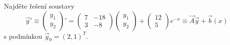 \begin{ex}
   Najděte řešení soustavy
   \[
      \vec{y}'\equiv
      \begin{pmatrix}
         y_1\\y_2
      \end{pmatrix}'
      =
      \begin{pmatrix}
         7 & -18 \\ 3 & -8
      \end{pmatrix}
      \begin{pmatrix}
         y_1\\y_2
      \end{pmatrix}
      +
      \begin{pmatrix}
         12 \\ 5
      \end{pmatrix}
      e^{-x}
      \equiv \vec{A}\vec{y}+\vec{b}(x)
   \]
   s podmínkou $\vec{y}_0=(2,1)^T$.
\end{ex}
